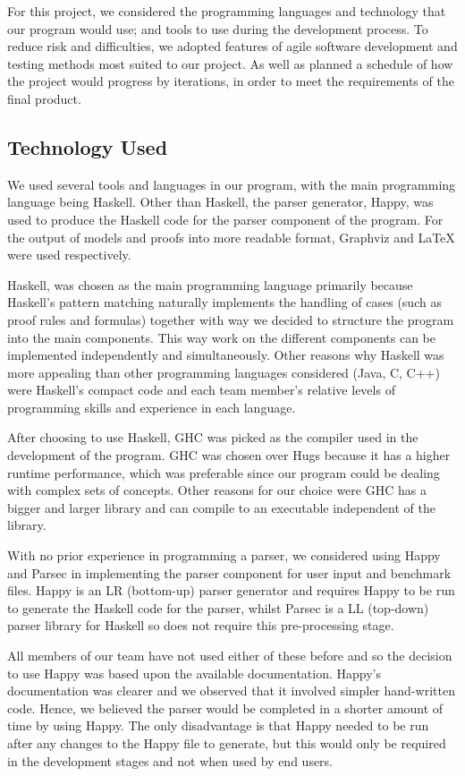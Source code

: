For this project, we considered the programming languages and technology that our program would use; and tools to use during the development process. To reduce risk and difficulties, we adopted features of agile software development and testing methods most suited to our project. As well as planned a schedule of how the project would progress by iterations, in order to meet the requirements of the final product.

\subsection{Technology Used}
\label{sec:techused}

We used several tools and languages in our program, with the main programming language being Haskell. Other than Haskell, the parser generator, Happy, was used to produce the Haskell code for the parser component of the program. For the output of models and proofs into more readable format, Graphviz and LaTeX were used respectively.

Haskell, was chosen as the main programming language primarily because Haskell's pattern matching naturally implements the handling of cases (such as proof rules and formulas) together with way we decided to structure the program into the main components. This way work on the different components can be implemented independently and simultaneously. Other reasons why Haskell was more appealing than other programming languages considered (Java, C, C++) were Haskell's compact code and each team member's relative levels of programming skills and experience in each language.

After choosing to use Haskell, GHC was picked as the compiler used in the development of the program. GHC was chosen over Hugs because it has a higher runtime performance, which was preferable since our program could be dealing with complex sets of concepts. Other reasons for our choice were GHC has a bigger and larger library and can compile to an executable independent of the library.

With no prior experience in programming a parser, we considered using Happy and Parsec in implementing the parser component for user input and benchmark files. Happy is an LR (bottom-up) parser generator and requires Happy to be run to generate the Haskell code for the parser, whilst Parsec is a LL (top-down) parser library for Haskell so does not require this pre-processing stage.

All members of our team have not used either of these before and so the decision to use Happy was based upon the available documentation. Happy's documentation was clearer and we observed that it involved simpler hand-written code. Hence, we believed the parser would be completed in a shorter amount of time by using Happy. The only disadvantage is that Happy needed to be run after any changes to the Happy file to generate, but this would only be required in the development stages and not when used by end users.

